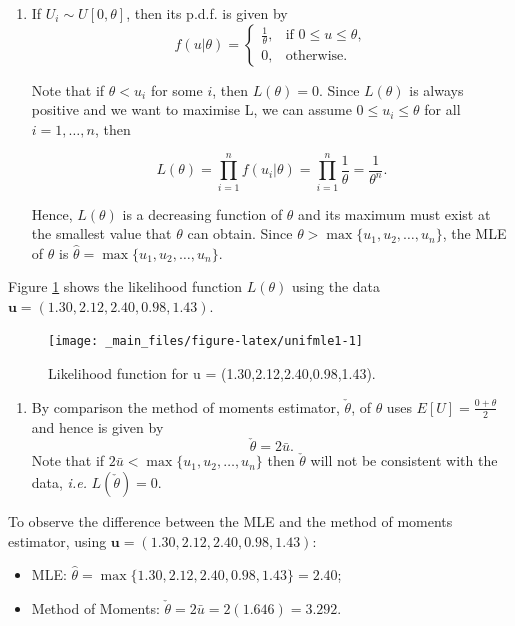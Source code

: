\documentclass[
]{book}
\providecommand{\tightlist}{%
  \setlength{\itemsep}{0pt}\setlength{\parskip}{0pt}}
\begin{document}
\hypertarget{MLE:exerprf:unif_mle}{}
\begin{enumerate}
\def\labelenumi{(\alph{enumi})}
\tightlist
\item
  If \(U_i \sim U[0,\theta]\), then its p.d.f. is given by\\

  \[f(u|\theta) = \begin{cases} \frac{1}{\theta}, & \text{if } 0 \leq u \leq \theta, \\[3pt]
  0, & \text{otherwise.} \end{cases}\]

  Note that if \(\theta< u_i\) for some \(i\), then \(L(\theta)=0\). Since \(L(\theta)\) is always positive and we want to maximise L, we can assume \(0 \leq u_i \leq \theta\) for all \(i=1,\dots,n\), then

  \[L(\theta) = \prod_{i=1}^n f(u_i|\theta) = \prod_{i=1}^n \frac{1}{\theta} = \frac{1}{\theta^n}.\]

  Hence, \(L(\theta)\) is a decreasing function of \(\theta\) and its maximum must exist at the smallest value that \(\theta\) can obtain. Since \(\theta > \max \{u_1,u_2,\dots,u_n\}\), the MLE of \(\theta\) is \(\hat{\theta} = \max \{u_1,u_2,\dots,u_n\}\).
\end{enumerate}

Figure \ref{fig:unifmle1} shows the likelihood function \(L(\theta)\) using the data \(\mathbf{u}= (1.30,2.12,2.40,0.98,1.43)\).

\begin{figure}
\texttt{[image: \_main\_files/figure-latex/unifmle1-1]} \caption{Likelihood function for u = (1.30,2.12,2.40,0.98,1.43).}\label{fig:unifmle1}
\end{figure}

\begin{enumerate}
\def\labelenumi{(\alph{enumi})}
\setcounter{enumi}{1}
\tightlist
\item
  By comparison the method of moments estimator, \(\check{\theta}\), of \(\theta\) uses \(E[U]= \frac{0 +\theta}{2}\) and hence is given by
  \[ \check{\theta} = 2 \bar{u}. \]
  Note that if \(2 \bar{u} < \max \{u_1,u_2,\dots,u_n\}\) then \(\check{\theta}\) will not be consistent with the data, \emph{i.e.} \(L(\check{\theta})=0\).
\end{enumerate}

To observe the difference between the MLE and the method of moments estimator, using \(\mathbf{u}= (1.30,2.12,2.40,0.98,1.43)\):

\begin{itemize}
\tightlist
\item
  MLE: \(\hat{\theta} = \max \{1.30,2.12,2.40,0.98,1.43 \} =2.40\);\\
\item
  Method of Moments: \(\check{\theta} =2 \bar{u} = 2 (1.646) =3.292\).\\
\end{itemize}
\end{document}
